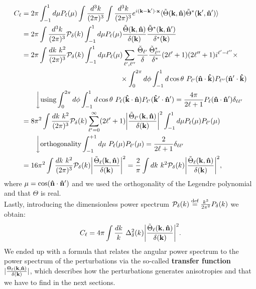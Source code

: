 \begin{align}
    C_{\ell}&=2\pi\int_{-1}^{1}d\mu P_{\ell}(\mu)\int\frac{d^3k}{(2\pi)^3}\int\frac{d^3k}{(2\pi)^3}e^{i(\mathbf k-\mathbf k')\cdot \mathbf x}\langle\tilde\Theta(\mathbf k,\versor n)\tilde\Theta^*(\mathbf k',\versor n')\rangle\nonumber\\
    &=2\pi\int\frac{d^3k}{(2\pi)^3}\mathcal P_{\delta}(k)\int_{-1}^{1}d\mu P_{\ell}(\mu)\frac{\tilde\Theta(\mathbf{k},\versor n)}{\delta(\mathbf{k})}\frac{\tilde\Theta^*(\mathbf{k},\versor n')}{\delta^*(\mathbf{k})}\nonumber\\
    &=2\pi\int\frac{dk\ k^2}{(2\pi)^3}\mathcal P_{\delta}(k)\int_{-1}^{1}d\mu P_{\ell}(\mu)\sum_{\ell',\ell''}\frac{\tilde\Theta_{\ell'}}{\delta}\frac{\tilde\Theta_{\ell''}^*}{\delta^*}(2\ell'+1)(2\ell''+1)i^{\ell'-\ell''}\times\nonumber\\
    &\qquad\qquad\qquad\qquad\qquad\qquad\qquad\times\int_0^{2\pi} d\phi \int_{-1}^{1} d\cos\theta\ P_{\ell'}(\versor n\cdot\versor k)P_{\ell''}(\versor n'\cdot\versor k)\nonumber\\
    &\qquad\bigg\downarrow\text{using}\int_0^{2\pi} d\phi \int_{-1}^{1} d\cos\theta\  P_\ell(\versor{k}\cdot\versor n)P_{\ell'}(\versor{k}'\cdot\versor n')=\frac{4\pi}{2\ell+1}P_\ell(\versor n\cdot\versor n')\delta_{\ell\ell'}\nonumber\\
    &=8\pi^2\int \frac{dk\ k^2}{(2\pi)^3}\mathcal{P}_{\delta}(k)\sum_{\ell'=0}^{\infty}(2\ell'+1)\bigg|\frac{\tilde\Theta_{\ell'}(\mathbf k,\versor n)}{\delta(\mathbf{k})}\bigg|^2\int_{-1}^{1}d\mu P_{\ell}(\mu)P_{\ell'}(\mu)\nonumber\\&\qquad\bigg\downarrow\text{orthogonality}\int_{-1}^{+1}d\mu\ P_\ell(\mu)P_{\ell'}(\mu)=\frac{2}{2\ell+1}\delta_{\ell\ell'}\nonumber\\
    &=16\pi^2\int \frac{dk\ k^2}{(2\pi)^3}\mathcal{P}_{\delta}(k)\bigg|\frac{\tilde\Theta_\ell(\mathbf k,\versor n)}{\delta(\mathbf{k})}\bigg|^2=\frac{2}{\pi}\int dk\ k^2\mathcal{P}_{\delta}(k)\bigg|\frac{\tilde\Theta_\ell(\mathbf k,\versor n)}{\delta(\mathbf{k})}\bigg|^2
    ,\label{eq:cl_pert}
\end{align}
where $\mu=\cos(\mathbf{\hat{n}}\cdot\mathbf{\hat{n}}')$ and we used the orthogonality of the Legendre polynomial and that $\Theta$ is real.\\
Lastly, introducing the dimensionless power spectrum $\mathcal{P}_{\delta}(k)\stackrel{\text{def}}{=}\frac{k^3}{2\pi^2} P_{\delta}(k)$ we obtain:
\begin{equation}
    C_{\ell}=4\pi\int \frac{dk}{k}\ \Delta^2_{\delta}(k)\bigg|\frac{\tilde\Theta_\ell(\mathbf k,\versor n)}{\delta(\mathbf{k})}\bigg|^2.
\end{equation}
We ended up with a formula that relates the angular power spectrum to the power spectrum of the perturbations via the so-called \textbf{transfer function} $|\frac{\Theta_\ell(\mathbf k,\mathbf{\hat{n}})}{\delta(\mathbf{k})}|$, which describes how the perturbations generates anisotropies and that we have to find in the next sections.\\
